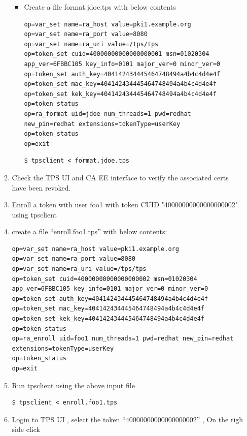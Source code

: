 \documentclass[12pt]{report}
\begin{document}
\begin{enumerate}[label*=\arabic*.]
\begin{enumerate}[label*=\arabic*.]
\begin{itemize}
                    \item \label{token_ex10} Create a file format.jdoe.tps with below contents
                        \begin{lstlisting}
op=var_set name=ra_host value=pki1.example.org
op=var_set name=ra_port value=8080
op=var_set name=ra_uri value=/tps/tps
op=token_set cuid=40000000000000000001 msn=01020304 app_ver=6FBBC105 key_info=0101 major_ver=0 minor_ver=0
op=token_set auth_key=404142434445464748494a4b4c4d4e4f
op=token_set mac_key=404142434445464748494a4b4c4d4e4f
op=token_set kek_key=404142434445464748494a4b4c4d4e4f
op=token_status
op=ra_format uid=jdoe num_threads=1 pwd=redhat new_pin=redhat extensions=tokenType=userKey
op=token_status
op=exit
                        \end{lstlisting}
                        \begin{lstlisting}[style=bashInputStyle]
$ tpsclient < format.jdoe.tps
                        \end{lstlisting}
                \end{itemize}
            \item \label{token_ex10} Check the TPS UI and CA EE interface to verify the associated certs have been revoked. 
            \item \label{token_ex11} Enroll a token with user foo1 with token CUID "40000000000000000002" using tpsclient
                    \item create a file ``enroll.foo1.tps'' with below contents:
                        \begin{lstlisting}[style=configFile]
op=var_set name=ra_host value=pki1.example.org
op=var_set name=ra_port value=8080
op=var_set name=ra_uri value=/tps/tps
op=token_set cuid=40000000000000000002 msn=01020304 app_ver=6FBBC105 key_info=0101 major_ver=0 minor_ver=0
op=token_set auth_key=404142434445464748494a4b4c4d4e4f
op=token_set mac_key=404142434445464748494a4b4c4d4e4f
op=token_set kek_key=404142434445464748494a4b4c4d4e4f
op=token_status
op=ra_enroll uid=foo1 num_threads=1 pwd=redhat new_pin=redhat extensions=tokenType=userKey
op=token_status
op=exit
                        \end{lstlisting}
                    \item Run tpsclient using the above input file 
                        \begin{lstlisting}[style=bashInputStyle]
$ tpsclient < enroll.foo1.tps
                        \end{lstlisting}
                    \item \label{token_ex12} Login to TPS UI , select the token ``40000000000000000002'' , On the righ side click 

\end{enumerate}
\end{enumerate}
\end{document}
